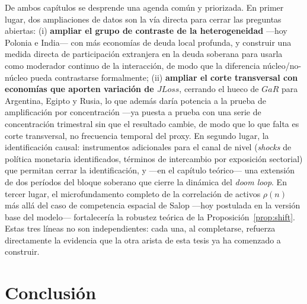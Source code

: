 De ambos capítulos se desprende una agenda común y priorizada. En primer lugar, dos ampliaciones de datos son la vía directa para cerrar las preguntas abiertas: (i) \textbf{ampliar el grupo de contraste de la heterogeneidad} —hoy Polonia e India— con más economías de deuda local profunda, y construir una medida directa de participación extranjera en la deuda soberana para usarla como moderador continuo de la interacción, de modo que la diferencia núcleo/no-núcleo pueda contrastarse formalmente; (ii) \textbf{ampliar el corte transversal con economías que aporten variación de $JLoss$}, cerrando el hueco de $GaR$ para Argentina, Egipto y Rusia, lo que además daría potencia a la prueba de amplificación por concentración —ya puesta a prueba con una serie de concentración trimestral sin que el resultado cambie, de modo que lo que falta es corte transversal, no frecuencia temporal del proxy. En segundo lugar, la identificación causal: instrumentos adicionales para el canal de nivel (\textit{shocks} de política monetaria identificados, términos de intercambio por exposición sectorial) que permitan cerrar la identificación, y —en el capítulo teórico— una extensión de dos períodos del bloque soberano que cierre la dinámica del \textit{doom loop}. En tercer lugar, el microfundamento completo de la correlación de activos $\rho(n)$ más allá del caso de competencia espacial de Salop —hoy postulada en la versión base del modelo— fortalecería la robustez teórica de la Proposición~\ref{prop:shift}. Estas tres líneas no son independientes: cada una, al completarse, refuerza directamente la evidencia que la otra arista de esta tesis ya ha comenzado a construir.

\section{Conclusión}

